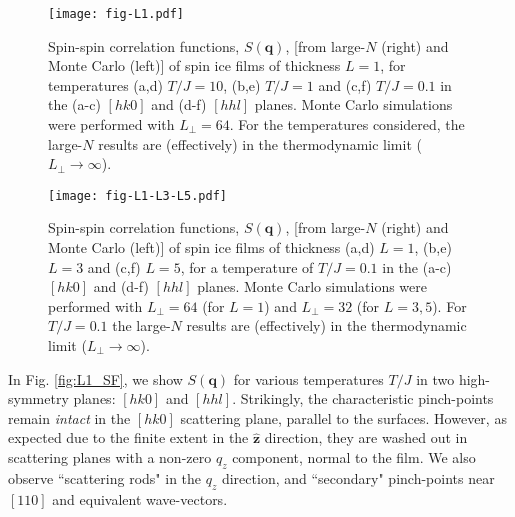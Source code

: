 \documentclass[aps,prx,reprint,runinaddress,superscriptaddress,amsmath,amssymb,floatfix,longbibliography]{revtex4-1}
\renewcommand{\vec}[1]{\boldsymbol{#1}}
\newcommand{\vhat}[1]{\vec{\hat{#1}}}
\begin{document}
\begin{figure*}
\centering
	\texttt{[image: fig-L1.pdf]}
	\caption{Spin-spin correlation functions, $S(\vec{q})$, [from large-$N$ (right) and Monte Carlo (left)] of spin ice films of thickness $L=1$, for temperatures (a,d) $T/J = 10$, (b,e) $T/J = 1$ and (c,f) $T/J = 0.1$ in the (a-c) $[hk0]$ and (d-f) $[hhl]$ planes. Monte Carlo simulations were performed with $L_{\perp}=64$. For the temperatures considered, the large-$N$ results are (effectively) in the thermodynamic limit ($L_\perp \rightarrow \infty$).
	\label{fig:L1_SF} }
	\vspace{0.5cm}
	\centering
	\texttt{[image: fig-L1-L3-L5.pdf]}
	\caption{
	Spin-spin correlation functions, $S(\vec{q})$,  [from large-$N$ (right) and Monte Carlo (left)] of spin ice films of thickness (a,d) $L=1$, (b,e) $L = 3$ and (c,f) $L = 5$, for a temperature of $T/J = 0.1$ in the (a-c) $[hk0]$ and (d-f) $[hhl]$ planes. Monte Carlo simulations were performed with $L_{\perp}=64$ (for $L=1$) and $L_{\perp}=32$ (for $L=3,5$). For $T/J = 0.1$ the large-$N$ results are (effectively) in the thermodynamic limit ($L_\perp \rightarrow \infty$).
\label{fig:thick_SF}}
\end{figure*}

In Fig. \ref{fig:L1_SF}, we show $S(\vec{q})$ for various temperatures $T/J$ in two high-symmetry planes: $[hk0]$ and $[hhl]$. Strikingly, the characteristic pinch-points remain \emph{intact} in the $[hk0]$ scattering plane, parallel to the surfaces. However, as expected due to the finite extent in the $\vhat{z}$ direction, they are washed out in scattering planes with a non-zero $q_z$ component, normal to the film. We also observe ``scattering rods" in the $q_z$ direction, and ``secondary" pinch-points near $[110]$ and equivalent wave-vectors. 
\end{document}
